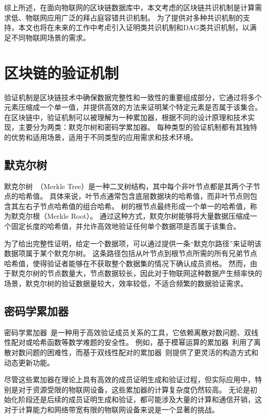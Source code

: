 综上所述，在面向物联网的区块链数据库中，本文考虑的区块链共识机制是计算需求低、物联网应用广泛的拜占庭容错共识机制。
为了提供对多种共识机制的支持，本文也将在未来的工作中考虍引入证明类共识机制和DAG类共识机制，以满足不同物联网场景的需求。

\section{区块链的验证机制}
验证机制是区块链技术中确保数据完整性和一致性的重要组成部分，它通过将多个元素压缩成一个单一值，并提供高效的方法来证明某个特定元素是否属于该集合。
在区块链中，验证机制可以被理解为一种累加器，根据不同的设计原理和技术实现，主要分为两类：默克尔树和密码学累加器。
每种类型的验证机制都有其独特的优势和适用场景，适用于不同类型的应用需求和技术环境。

\subsection{默克尔树}
默克尔树~\cite{bohme2015bitcoin}（Merkle Tree）是一种二叉树结构，其中每个非叶节点都是其两个子节点的哈希值。
具体来说，叶节点通常包含底层数据块的哈希值，而非叶节点则包含其左右子节点哈希值的组合哈希。
树的根节点最终形成一个单一的哈希值，称为默克尔根（Merkle Root）。
通过这种方式，默克尔树能够将大量数据压缩成一个固定长度的哈希值，并允许高效地验证任何单个数据项是否属于该集合。

为了给出完整性证明，给定一个数据项，可以通过提供一条“默克尔路径”来证明该数据项属于某个默克尔树。
这条路径包括从叶节点到根节点所需的所有兄弟节点哈希值，使得验证者能够在不获取整个数据集的情况下确认成员资格。
然而，由于默克尔树的节点数量大，节点数据较长，因此对于物联网这种数据产生频率快的场景，默克尔树的验证数据量较大，效率较低，不适合频繁的数据验证需求。

\subsection{密码学累加器}
密码学累加器~\cite{ren2022cryptographic}是一种用于高效验证成员关系的工具，它依赖离散对数问题、双线性配对或哈希函数等数学难题的安全性。
例如，基于模幂运算的累加器~\cite{goodrich2002efficient}利用了离散对数问题的困难性，而基于双线性配对的累加器~\cite{li2007universal}则提供了更灵活的构造方式和动态更新功能。

尽管这些累加器在理论上具有高效的成员证明生成和验证过程，但实际应用中，特别是对于资源受限的物联网设备，这些累加器的计算复杂度仍然较高。
无论是初始化阶段还是后续的成员证明生成和验证，都可能涉及大量的计算和通信开销，这对于计算能力和网络带宽有限的物联网设备来说是一个显著的挑战。

